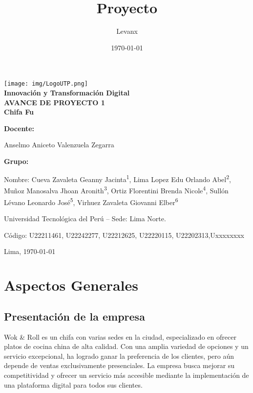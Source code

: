 \documentclass{article}
\title{Proyecto}
\author{Levanx}
\date{\today}
\begin{document}
\begin{doublespace}
\begin{center}
    \vspace*{1cm}

    \centering
    \texttt{[image: img/LogoUTP.png]}\\[1cm]
    
    \large{\textbf{Innovación y Transformación Digital}} 
    \\[0.5cm] 
    
    \large{\bf AVANCE DE PROYECTO 1}
    \\[0.5cm] 
    \LARGE \textbf{{Chifa Fu}}
\end{center}
\vspace{2cm}
\large{\bf Docente: }
\begin{center}
    \large{Anselmo Aniceto Valenzuela Zegarra}
\end{center}
\large{\bf Grupo: }
\begin{center}
    \large{Nombre: Cueva Zavaleta Geanny Jacinta\textsuperscript{1}, Lima Lopez Edu Orlando Abel\textsuperscript{2}, Muñoz Manosalva Jhoan Aronith\textsuperscript{3}, Ortiz Florentini Brenda Nicole\textsuperscript{4}, Sullón Lévano Leonardo José\textsuperscript{5}, Virhuez Zavaleta Giovanni Elber\textsuperscript{6}}
\end{center}
\begin{center}
    \large{ Universidad Tecnológica del Perú – Sede: Lima Norte.}
\end{center}
    
\begin{center}
    \large{Código: U22211461, U22242277, U22212625, U22220115, U22202313,Uxxxxxxxx}
\end{center}
\begin{center}
Lima, \today
\end{center}
\newpage
\vspace*{0.1cm}
\tableofcontents
\newpage
\vspace*{0.2cm}
\section{Aspectos Generales}
    \subsection{Presentación de la empresa}
    \noindent Wok \& Roll es un chifa con varias sedes en la ciudad, especializado en ofrecer
platos de cocina china de alta calidad. Con una amplia variedad de opciones y un servicio excepcional, ha logrado ganar la preferencia de los clientes, pero aún depende de ventas exclusivamente presenciales. La empresa busca mejorar su competitividad y ofrecer un servicio más accesible mediante la implementación de una plataforma digital para todos sus clientes.


\end{doublespace}
\end{document}
